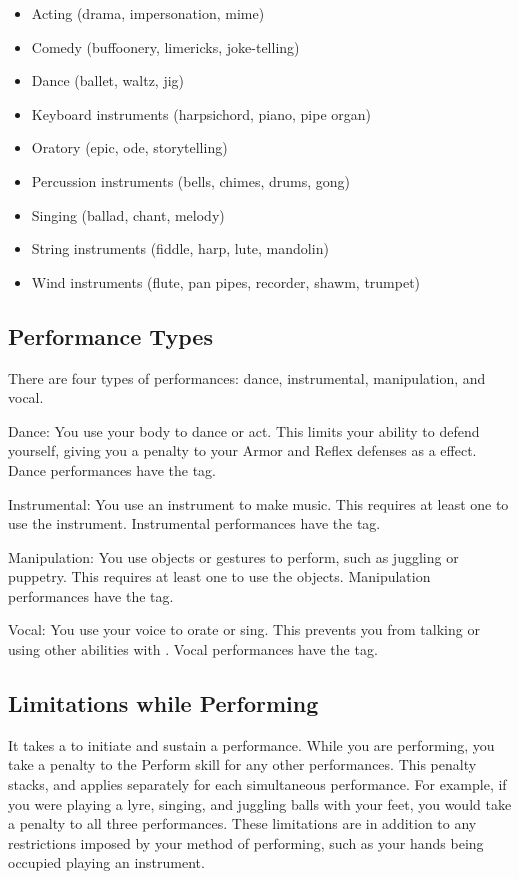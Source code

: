   \begin{itemize}
    \item Acting (drama, impersonation, mime)
    \item Comedy (buffoonery, limericks, joke-telling)
    \item Dance (ballet, waltz, jig)
    \item Keyboard instruments (harpsichord, piano, pipe organ)
    \item Oratory (epic, ode, storytelling)
    \item Percussion instruments (bells, chimes, drums, gong)
    \item Singing (ballad, chant, melody)
    \item String instruments (fiddle, harp, lute, mandolin)
    \item Wind instruments (flute, pan pipes, recorder, shawm, trumpet)
  \end{itemize}

  \subsection{Performance Types}\label{Performance Types}
    There are four types of performances: dance, instrumental, manipulation, and vocal.
    \begin{raggeditemize}
      \item Dance: You use your body to dance or act. This limits your ability to defend yourself, giving you a  penalty to your Armor and Reflex defenses as a \atSwift effect. Dance performances have the \atVisual tag.
      \item Instrumental: You use an instrument to make music. This requires at least one  to use the instrument. Instrumental performances have the \atAuditory tag.
      \item Manipulation: You use objects or gestures to perform, such as juggling or puppetry. This requires at least one  to use the objects. Manipulation performances have the \atVisual tag.
      \item Vocal: You use your voice to orate or sing. This prevents you from talking or using other abilities with . Vocal performances have the \atAuditory tag.
    \end{raggeditemize}

  \subsection{Limitations while Performing}
    It takes a  to initiate and sustain a performance.
    While you are performing, you take a  penalty to the Perform skill for any other performances.
    This penalty stacks, and applies separately for each simultaneous performance.
    For example, if you were playing a lyre, singing, and juggling balls with your feet, you would take a  penalty to all three performances.
    These limitations are in addition to any restrictions imposed by your method of performing, such as your hands being occupied playing an instrument.

